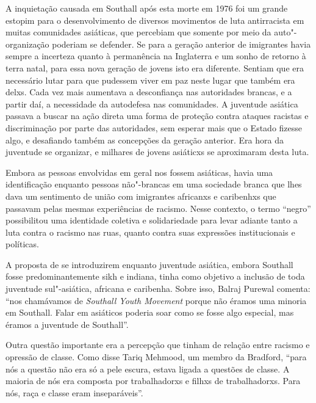 A inquietação causada em Southall após esta morte em 1976 foi um grande estopim para o desenvolvimento de diversos movimentos de luta antirracista em muitas comunidades asiáticas, que percebiam que somente por meio da auto"-organização poderiam se defender. Se para a geração anterior de imigrantes havia sempre a incerteza quanto à permanência na Inglaterra e um sonho de retorno à terra natal, para essa nova geração de jovens isto era diferente. Sentiam que era necessário lutar para que pudessem viver em paz neste lugar que também era delxs. Cada vez mais aumentava a desconfiança nas autoridades brancas, e a partir daí, a necessidade da autodefesa nas comunidades. A juventude asiática passava a buscar na ação direta uma forma de proteção contra ataques racistas e discriminação por parte das autoridades, sem esperar mais que o Estado fizesse algo, e desafiando também as concepções da geração anterior. Era hora da juventude se organizar, e milhares de jovens asiáticxs se aproximaram desta luta.

Embora as pessoas envolvidas em geral nos  fossem asiáticas, havia uma identificação enquanto pessoas não"-brancas em uma sociedade branca que lhes dava um sentimento de união com imigrantes africanxs e caribenhxs que passavam pelas mesmas experiências de racismo. Nesse contexto, o termo ``negro'' possibilitou uma identidade coletiva e solidariedade para levar adiante tanto a luta contra o racismo nas ruas, quanto contra suas expressões institucionais e políticas.


A proposta de se introduzirem enquanto juventude asiática, embora Southall fosse predominantemente sikh e indiana, tinha como objetivo a inclusão de toda juventude sul"-asiática, africana e caribenha. Sobre isso, Balraj Purewal comenta: ``nos chamávamos de \emph{Southall Youth Movement} porque não éramos uma minoria em Southall. Falar em asiáticos poderia soar como se fosse algo especial, mas éramos a juventude de Southall''.

Outra questão importante era a percepção que tinham de relação entre racismo e opressão de classe. Como disse Tariq Mehmood, um membro da  Bradford, ``para nós a questão não era só a pele escura, estava ligada a questões de classe. A maioria de nós era composta por trabalhadorxs e filhxs de trabalhadorxs. Para nós, raça e classe eram inseparáveis''.

